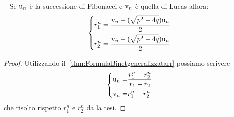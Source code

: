 \begin{thm}~\cite{Rabinowitz_1996}\label{thm:FibLucRimuovirr}
	Se $\mathrm{u}_{n}$ è la successione di Fibonacci e  $\mathrm{v}_{n}$ è quella di Lucas 
	allora:\begin{equation}
		\left\{\begin{aligned}
			r_1^n={}&\dfrac{\mathrm{v}_{n}+(\sqrt{p^2-4q})\mathrm{u}_{n}}{2}\\
			r_2^n={}&\dfrac{\mathrm{v}_{n}-(\sqrt{p^2-4q})\mathrm{u}_{n}}{2}\\
		\end{aligned}
		\right.
	\end{equation}
\end{thm}
\begin{proof}
	Utilizzando il~\vref{thm:FormulaBinetgeneralizzatarr} 
	possiamo scrivere
	\begin{equation*}
		\left\{
		\begin{aligned}
			\mathrm{u}_{n}=&\dfrac{r_{1}^n-r_{2}^n}{r_{1}-r_{2}}\\
			\mathrm{v}_{n}=&r_{1}^n+r_{2}^n
		\end{aligned}
		\right.
	\end{equation*}
	che risolto rispetto $r_1^n$ e $r_2^n$ da la tesi.
\end{proof}
